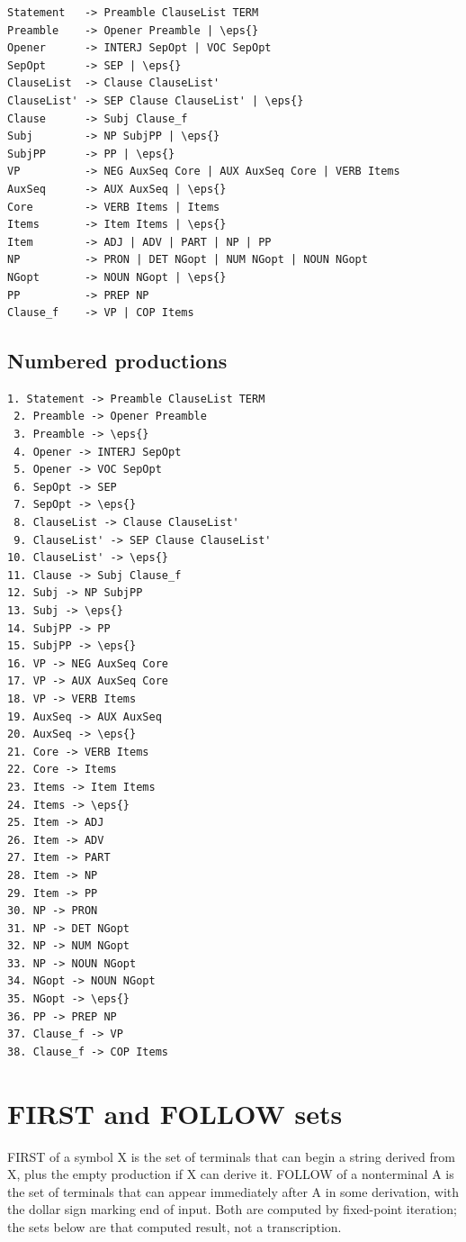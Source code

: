 \documentclass[11pt,a4paper]{article}
\newcommand{\vbfmt}{\color{ink!88}}
\newcommand{\eps}{\ensuremath{\varepsilon}}
\begin{document}
\begin{Verbatim}[commandchars=\\\{\},fontsize=\small,formatcom=\vbfmt,frame=leftline,framerule=1.2pt,rulecolor=\color{clay!55},framesep=6pt,xleftmargin=10pt,xrightmargin=4pt]
Statement   -> Preamble ClauseList TERM
Preamble    -> Opener Preamble | \eps{}
Opener      -> INTERJ SepOpt | VOC SepOpt
SepOpt      -> SEP | \eps{}
ClauseList  -> Clause ClauseList'
ClauseList' -> SEP Clause ClauseList' | \eps{}
Clause      -> Subj Clause_f
Subj        -> NP SubjPP | \eps{}
SubjPP      -> PP | \eps{}
VP          -> NEG AuxSeq Core | AUX AuxSeq Core | VERB Items
AuxSeq      -> AUX AuxSeq | \eps{}
Core        -> VERB Items | Items
Items       -> Item Items | \eps{}
Item        -> ADJ | ADV | PART | NP | PP
NP          -> PRON | DET NGopt | NUM NGopt | NOUN NGopt
NGopt       -> NOUN NGopt | \eps{}
PP          -> PREP NP
Clause_f    -> VP | COP Items
\end{Verbatim}
\subsection{Numbered productions}
\begin{Verbatim}[commandchars=\\\{\},fontsize=\small,formatcom=\vbfmt,frame=leftline,framerule=1.2pt,rulecolor=\color{clay!55},framesep=6pt,xleftmargin=10pt,xrightmargin=4pt]
 1. Statement -> Preamble ClauseList TERM
 2. Preamble -> Opener Preamble
 3. Preamble -> \eps{}
 4. Opener -> INTERJ SepOpt
 5. Opener -> VOC SepOpt
 6. SepOpt -> SEP
 7. SepOpt -> \eps{}
 8. ClauseList -> Clause ClauseList'
 9. ClauseList' -> SEP Clause ClauseList'
10. ClauseList' -> \eps{}
11. Clause -> Subj Clause_f
12. Subj -> NP SubjPP
13. Subj -> \eps{}
14. SubjPP -> PP
15. SubjPP -> \eps{}
16. VP -> NEG AuxSeq Core
17. VP -> AUX AuxSeq Core
18. VP -> VERB Items
19. AuxSeq -> AUX AuxSeq
20. AuxSeq -> \eps{}
21. Core -> VERB Items
22. Core -> Items
23. Items -> Item Items
24. Items -> \eps{}
25. Item -> ADJ
26. Item -> ADV
27. Item -> PART
28. Item -> NP
29. Item -> PP
30. NP -> PRON
31. NP -> DET NGopt
32. NP -> NUM NGopt
33. NP -> NOUN NGopt
34. NGopt -> NOUN NGopt
35. NGopt -> \eps{}
36. PP -> PREP NP
37. Clause_f -> VP
38. Clause_f -> COP Items
\end{Verbatim}
\section{FIRST and FOLLOW sets}
\label{sec:first-and-follow-sets}
FIRST of a symbol X is the set of terminals that can begin a string derived from X, plus the empty production if X can derive it. FOLLOW of a nonterminal A is the set of terminals that can appear immediately after A in some derivation, with the dollar sign marking end of input. Both are computed by fixed-point iteration; the sets below are that computed result, not a transcription.
\end{document}
